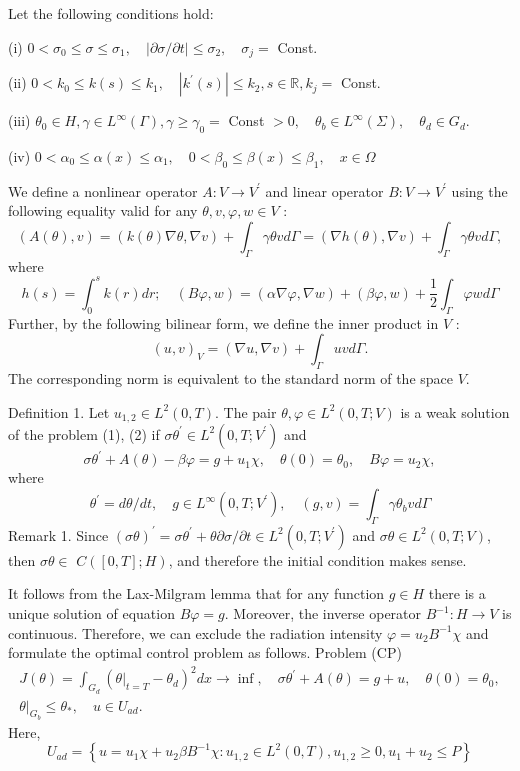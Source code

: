 \documentclass[10pt]{article}
\begin{document}
Let the following conditions hold:

(i) $0<\sigma_{0} \leq \sigma \leq \sigma_{1}, \quad|\partial \sigma / \partial t| \leq \sigma_{2}, \quad \sigma_{j}=$ Const.

(ii) $0<k_{0} \leq k(s) \leq k_{1}, \quad\left|k^{\prime}(s)\right| \leq k_{2}, s \in \mathbb{R}, k_{j}=$ Const.

(iii) $\theta_{0} \in H, \gamma \in L^{\infty}(\Gamma), \gamma \geq \gamma_{0}=$ Const $>0, \quad \theta_{b} \in L^{\infty}(\Sigma), \quad \theta_{d} \in G_{d}$.

(iv) $0<\alpha_{0} \leq \alpha(x) \leq \alpha_{1}, \quad 0<\beta_{0} \leq \beta(x) \leq \beta_{1}, \quad x \in \Omega$

We define a nonlinear operator $A: V \rightarrow V^{\prime}$ and linear operator $B: V \rightarrow V^{\prime}$ using the following equality valid for any $\theta, v, \varphi, w \in V$ :
$$
(A(\theta), v)=(k(\theta) \nabla \theta, \nabla v)+\int_{\Gamma} \gamma \theta v d \Gamma=(\nabla h(\theta), \nabla v)+\int_{\Gamma} \gamma \theta v d \Gamma,
$$
where
$$
h(s)=\int_{0}^{s} k(r) d r ; \quad(B \varphi, w)=(\alpha \nabla \varphi, \nabla w)+(\beta \varphi, w)+\frac{1}{2} \int_{\Gamma} \varphi w d \Gamma
$$
Further, by the following bilinear form, we define the inner product in $V$ :
$$
(u, v)_{V}=(\nabla u, \nabla v)+\int_{\Gamma} u v d \Gamma .
$$
The corresponding norm is equivalent to the standard norm of the space $V$.

Definition 1. Let $u_{1,2} \in L^{2}(0, T)$. The pair $\theta, \varphi \in L^{2}(0, T ; V)$ is a weak solution of the problem (1), (2) if $\sigma \theta^{\prime} \in L^{2}\left(0, T ; V^{\prime}\right)$ and
$$
\sigma \theta^{\prime}+A(\theta)-\beta \varphi=g+u_{1} \chi, \quad \theta(0)=\theta_{0}, \quad B \varphi=u_{2} \chi,
$$
where
$$
\theta^{\prime}=d \theta / d t, \quad g \in L^{\infty}\left(0, T ; V^{\prime}\right), \quad(g, v)=\int_{\Gamma} \gamma \theta_{b} v d \Gamma
$$
Remark 1. Since $(\sigma \theta)^{\prime}=\sigma \theta^{\prime}+\theta \partial \sigma / \partial t \in L^{2}\left(0, T ; V^{\prime}\right)$ and $\sigma \theta \in L^{2}(0, T ; V)$, then $\sigma \theta \in$ $C([0, T] ; H)$, and therefore the initial condition makes sense.

It follows from the Lax-Milgram lemma that for any function $g \in H$ there is a unique solution of equation $B \varphi=g$. Moreover, the inverse operator $B^{-1}: H \rightarrow V$ is continuous. Therefore, we can exclude the radiation intensity $\varphi=u_{2} B^{-1} \chi$ and formulate the optimal control problem as follows. Problem (CP)
$$
\begin{gathered}
J(\theta)=\int_{G_{d}}\left(\left.\theta\right|_{t=T}-\theta_{d}\right)^{2} d x \rightarrow \inf , \quad \sigma \theta^{\prime}+A(\theta)=g+u, \quad \theta(0)=\theta_{0}, \\
\left.\theta\right|_{G_{b}} \leq \theta_{*}, \quad u \in U_{a d} .
\end{gathered}
$$
Here,
$$
U_{a d}=\left\{u=u_{1} \chi+u_{2} \beta B^{-1} \chi: u_{1,2} \in L^{2}(0, T), u_{1,2} \geq 0, u_{1}+u_{2} \leq P\right\}
$$
\end{document}
